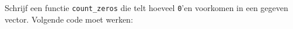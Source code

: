 \begin{question}
  Schrijf een functie {\tt count\_zeros} die telt hoeveel {\tt 0}'en voorkomen in een gegeven vector.
  Volgende code moet werken:
\begin{solutionblock}
\end{solutionblock}
\end{question}
